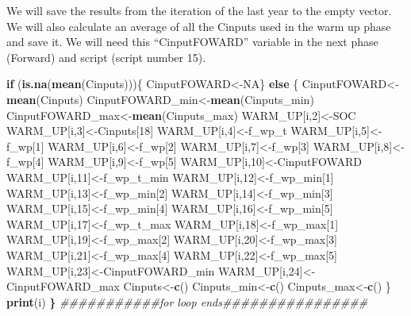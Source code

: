 \documentclass[
  10pt,
  b5paper,
]{book}
\newenvironment{Shaded}{\begin{snugshade}}{\end{snugshade}}
\newcommand{\CommentTok}[1]{\textcolor[rgb]{0.56,0.35,0.01}{\textit{#1}}}
\newcommand{\ControlFlowTok}[1]{\textcolor[rgb]{0.13,0.29,0.53}{\textbf{#1}}}
\newcommand{\DecValTok}[1]{\textcolor[rgb]{0.00,0.00,0.81}{#1}}
\newcommand{\ErrorTok}[1]{\textcolor[rgb]{0.64,0.00,0.00}{\textbf{#1}}}
\newcommand{\KeywordTok}[1]{\textcolor[rgb]{0.13,0.29,0.53}{\textbf{#1}}}
\newcommand{\NormalTok}[1]{#1}
\newcommand{\OtherTok}[1]{\textcolor[rgb]{0.56,0.35,0.01}{#1}}
\begin{document}
We will save the results from the iteration of the last year to the empty vector. We will also calculate an average of all the Cinputs used in the warm up phase and save it. We will need this ``CinputFOWARD'' variable in the next phase (Forward) and script (script number 15).

\begin{Shaded}
\begin{Highlighting}[]
\ControlFlowTok{if}\NormalTok{ (}\KeywordTok{is.na}\NormalTok{(}\KeywordTok{mean}\NormalTok{(Cinputs)))\{ CinputFOWARD<-}\OtherTok{NA}\NormalTok{\} }\ControlFlowTok{else}\NormalTok{ \{ }
\NormalTok{CinputFOWARD<-}\KeywordTok{mean}\NormalTok{(Cinputs)}
\NormalTok{CinputFOWARD_min<-}\KeywordTok{mean}\NormalTok{(Cinputs_min)}
\NormalTok{CinputFOWARD_max<-}\KeywordTok{mean}\NormalTok{(Cinputs_max)}
\NormalTok{WARM_UP[i,}\DecValTok{2}\NormalTok{]<-SOC}
\NormalTok{WARM_UP[i,}\DecValTok{3}\NormalTok{]<-Cinputs[}\DecValTok{18}\NormalTok{]}
\NormalTok{WARM_UP[i,}\DecValTok{4}\NormalTok{]<-f_wp_t}
\NormalTok{WARM_UP[i,}\DecValTok{5}\NormalTok{]<-f_wp[}\DecValTok{1}\NormalTok{]}
\NormalTok{WARM_UP[i,}\DecValTok{6}\NormalTok{]<-f_wp[}\DecValTok{2}\NormalTok{]}
\NormalTok{WARM_UP[i,}\DecValTok{7}\NormalTok{]<-f_wp[}\DecValTok{3}\NormalTok{]}
\NormalTok{WARM_UP[i,}\DecValTok{8}\NormalTok{]<-f_wp[}\DecValTok{4}\NormalTok{]}
\NormalTok{WARM_UP[i,}\DecValTok{9}\NormalTok{]<-f_wp[}\DecValTok{5}\NormalTok{]}
\NormalTok{WARM_UP[i,}\DecValTok{10}\NormalTok{]<-CinputFOWARD}
\NormalTok{WARM_UP[i,}\DecValTok{11}\NormalTok{]<-f_wp_t_min}
\NormalTok{WARM_UP[i,}\DecValTok{12}\NormalTok{]<-f_wp_min[}\DecValTok{1}\NormalTok{]}
\NormalTok{WARM_UP[i,}\DecValTok{13}\NormalTok{]<-f_wp_min[}\DecValTok{2}\NormalTok{]}
\NormalTok{WARM_UP[i,}\DecValTok{14}\NormalTok{]<-f_wp_min[}\DecValTok{3}\NormalTok{]}
\NormalTok{WARM_UP[i,}\DecValTok{15}\NormalTok{]<-f_wp_min[}\DecValTok{4}\NormalTok{]}
\NormalTok{WARM_UP[i,}\DecValTok{16}\NormalTok{]<-f_wp_min[}\DecValTok{5}\NormalTok{]}
\NormalTok{WARM_UP[i,}\DecValTok{17}\NormalTok{]<-f_wp_t_max}
\NormalTok{WARM_UP[i,}\DecValTok{18}\NormalTok{]<-f_wp_max[}\DecValTok{1}\NormalTok{]}
\NormalTok{WARM_UP[i,}\DecValTok{19}\NormalTok{]<-f_wp_max[}\DecValTok{2}\NormalTok{]}
\NormalTok{WARM_UP[i,}\DecValTok{20}\NormalTok{]<-f_wp_max[}\DecValTok{3}\NormalTok{]}
\NormalTok{WARM_UP[i,}\DecValTok{21}\NormalTok{]<-f_wp_max[}\DecValTok{4}\NormalTok{]}
\NormalTok{WARM_UP[i,}\DecValTok{22}\NormalTok{]<-f_wp_max[}\DecValTok{5}\NormalTok{]}
\NormalTok{WARM_UP[i,}\DecValTok{23}\NormalTok{]<-CinputFOWARD_min}
\NormalTok{WARM_UP[i,}\DecValTok{24}\NormalTok{]<-CinputFOWARD_max}
\NormalTok{Cinputs<-}\KeywordTok{c}\NormalTok{()}
\NormalTok{Cinputs_min<-}\KeywordTok{c}\NormalTok{()}
\NormalTok{Cinputs_max<-}\KeywordTok{c}\NormalTok{()}
\NormalTok{\}}
\KeywordTok{print}\NormalTok{(i)}
\ErrorTok{\}}
\CommentTok{###########for loop ends################}
\end{Highlighting}
\end{Shaded}
\end{document}
